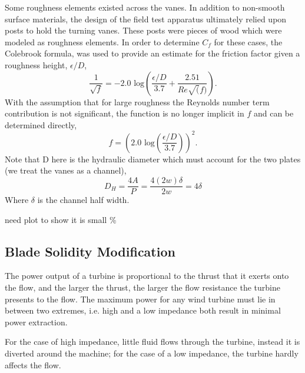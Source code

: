 Some roughness elements existed across the vanes. In addition to
non-smooth surface materials, the design of the field test apparatus
ultimately relied upon posts to hold the turning vanes. These posts were
pieces of wood which were modeled as roughness elements. In order to
determine $C_f$ for these cases, the Colebrook formula\cite{Colebrook367},
was used to provide an estimate for the friction factor given a
roughness height, $\epsilon/D$,  
\begin{equation}
 \frac{1}{\sqrt{f}} = -2.0 \text{ log}\left(\frac{\epsilon/D}{3.7} + \frac{2.51}{Re\sqrt(f)}\right).
\end{equation}
 With the assumption that for large roughness the Reynolds number term
 contribution is not significant, the function is no longer implicit in
 $f$ and can be determined directly, 
\begin{equation}
 f = \left(2.0 \text{ log}\left(\frac{\epsilon/D}{3.7}\right)\right)^2. 
\end{equation}
Note that D here is the hydraulic diameter which must account for the
two plates (we treat the vanes as a channel),
\begin{equation}
D_H = \frac{4 A}{P} = \frac{4 (2w)\delta}{2w} = 4 \delta
\end{equation}
Where $\delta$ is the channel half width.

need plot to show it is small \%


\subsection{Blade Solidity Modification}
\label{sec:solidity}
%
%

The power output of a turbine is proportional to the thrust that it
exerts onto the flow, and the larger the thrust, the larger the flow
resistance the turbine presents to the flow. The maximum power for any
wind turbine must lie in between two extremes, i.e. high and
a low impedance both result in minimal power
extraction\cite{solidity_oxford}.  

For the case of high impedance, little fluid flows through the
turbine, instead it is diverted around the machine; for the case of a
low impedance, the turbine hardly affects the flow. 

